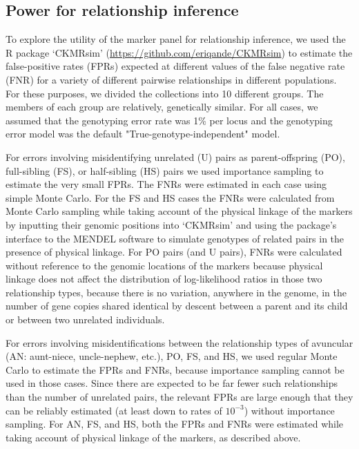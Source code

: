 \subsection*{Power for relationship inference}

To explore the utility of the marker panel for relationship inference, we used
the R package `CKMRsim'
(\url{https://github.com/eriqande/CKMRsim})
to estimate the false-positive rates (FPRs) expected at
different values of the false negative rate (FNR) for a variety of different pairwise
relationships in different populations.  For these purposes, we divided the
collections into 10 different groups.  The members of each group are
relatively, genetically similar.  For all cases, we assumed that the genotyping error rate
was 1\% per locus and the genotyping error model was the default
"True-genotype-independent" model.

For errors involving misidentifying
unrelated (U) pairs as parent-offspring (PO), full-sibling (FS), or half-sibling (HS)
pairs we used importance sampling to estimate the very small FPRs.  The
FNRs were estimated in each case using simple Monte Carlo.  For the FS and
HS cases the FNRs were calculated from Monte Carlo sampling while taking account
of the physical linkage of the markers by inputting their genomic positions into
`CKMRsim' and using the package's interface to the MENDEL \citep{lange2013mendel}
software to simulate genotypes of related pairs
in the presence of physical linkage.  For PO pairs (and U pairs),
FNRs were calculated without reference to the genomic locations of the markers
because physical linkage does not
affect the distribution of log-likelihood ratios in those two relationship types,
because there is no variation, anywhere
in the genome, in the number of gene copies shared identical by descent between
a parent and its child or between two unrelated individuals.

For errors involving misidentifications between the relationship
types of avuncular (AN: aunt-niece, uncle-nephew, etc.), PO, FS, and HS,
we used regular Monte Carlo to estimate the FPRs and FNRs, because
importance sampling cannot be used in those cases. Since there are
expected to be far fewer such relationships than the number of unrelated
pairs, the relevant FPRs are large enough that they can be reliably estimated
(at least down to rates of $10^{-3}$) without importance sampling.
For AN, FS, and HS, both the
FPRs and FNRs were estimated while taking account of physical linkage
of the markers, as described above.

